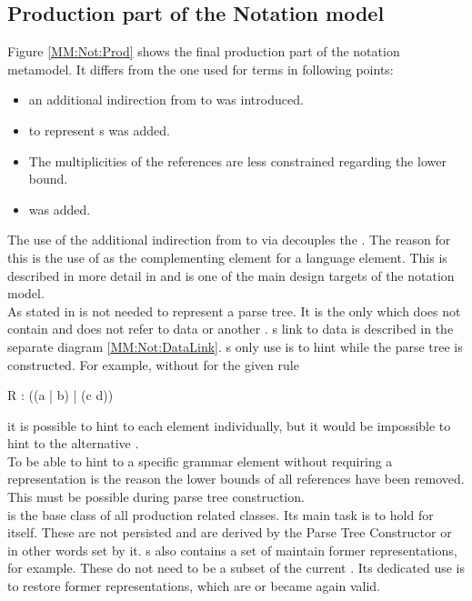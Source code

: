 \subsection{Production part of the Notation model}
Figure \ref{MM:Not:Prod} shows the final production part of the notation metamodel. It differs from the one used for terms in following points:
\begin{itemize}
	\item an additional indirection from  to  was introduced. 
	\item {} to represent s was added.
	\item The multiplicities of the references are less constrained regarding the lower bound.
	\item {} was added.
\end{itemize}
The use of the additional indirection from  to  via  decouples the . The reason for this is the use of  as the complementing element for a language element. This is described in more detail in  and is one of the main design targets of the notation model.\\
As stated in   is not needed to represent a parse tree. It is the only  which does not contain and does not refer to data or another . s link to data is described in the separate diagram \ref{MM:Not:DataLink}. s only use is to hint while the parse tree is constructed. For example, without  for the given rule
\begin{xtxt}
R : ((a | b) | (c d)) 
\end{xtxt}
it is possible to hint to each element individually, but it would be impossible to hint to the alternative . \\
To be able to hint to a specific grammar element without requiring a representation is the reason the lower bounds of all references have been removed. This must be possible during parse tree construction.\\
 is the base class of all production related classes. Its main task is to hold  for itself. These  are not persisted and are derived by the Parse Tree Constructor or in other words set by it. s also contains a set of  maintain former representations, for example. These do not need to be a subset of the current . Its dedicated use is to restore former representations, which are or became again valid.


